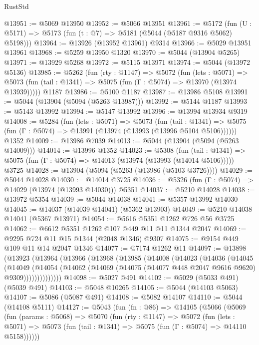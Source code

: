 \begin{lexlean}{RustStd}
\begin{coremodule}
@13951 := @5069 @13950
@13952 := @5066 @13951
@13961 := @5172 (fun (U : @5171) => @5173 (fun (t : @7) => @5181 (@5044 (@5187 @9316 @5062) @5198)))
@13964 := @13926 (@13952 @13961) @9314
@13966 := @5029 @13951 @13961
@13968 := @5259 @13950 @1320
@13970 := @5044 (@13904 @5265)
@13971 := @13929 @5268
@13972 := @5115 @13971
@13974 := @5044 (@13972 @5136)
@13985 := @5262
    (fun (rty : @1147) =>
    @5072
      (fun (lets : @5071) =>
      @5073 (fun (tail : @1341) => @5075 (fun (Γ : @5074) => @13970 (@13974 @13939)))))
    @1187
@13986 := @5100 @1187
@13987 := @13986 @5108
@13991 := @5044 (@13904 (@5094 (@5263 @13987)))
@13992 := @5144 @1187
@13993 := @5143 @13992
@13994 := @5147 @13992
@13996 := @13994 @13934 @9319
@14008 := @5284
    (fun (lets : @5071) =>
    @5073
      (fun (tail : @1341) =>
      @5075 (fun (Γ : @5074) => @13991 (@13974 (@13993 (@13996 @5104 @5106))))))
    @1352
@14009 := @13986 @7039
@14013 := @5044 (@13904 (@5094 (@5263 @14009)))
@14014 := @13996 @1352
@14023 := @5308
    (fun (tail : @1341) => @5075 (fun (Γ : @5074) => @14013 (@13974 (@13993 (@14014 @5106)))))
    @3725
@14028 := @13904 (@5094 (@5263 (@13986 (@5103 @3726))))
@14029 := @5044 @14028
@14030 := @14014 @3725
@14036 := @5326 (fun (Γ : @5074) => @14029 (@13974 (@13993 @14030))) @5351
@14037 := @5210 @14028
@14038 := @13972 @5354
@14039 := @5044 @14038
@14041 := @5357 @13992 @14030
@14045 := @14037 (@14039 @14041) (@5362 @13903)
@14049 := @5210 @14038 @14041 (@5367 @13971)
@14054 := @5616 @5351 @1262 @726 @56 @3725
@14062 := @6612 @5351 @1262 @107 @449 @11 @11 @1344 @2047
@14069 := @9295 @724 @11 @15 @1344 (@2048 @1346) @9307
@14075 := @9154 @449 @109 @11 @14 @2047 @1346
@14077 := @7174 @1262 @11
@14097 := @13898
    (@13923
      (@13964
        (@13966
          (@13968
            (@13985
              (@14008
                (@14023
                  (@14036
                    (@14045
                      (@14049
                        (@14054
                          (@14062
                            (@14069 (@14075 (@14077 @448 @2047 @9616 @9620) @9309))))))))))))))
@14098 := @5027 @491
@14102 := @5029 (@5033 @491) (@5039 @491)
@14103 := @5048 @10265
@14105 := @5044 (@14103 @5063)
@14107 := @5086 (@5087 @491)
@14108 := @5082 @14107
@14110 := @5044 (@14108 @5111)
@14127 := @5043
    (fun (fn : @86) =>
    @14105
      (@5066
        (@5069
          (fun (params : @5068) =>
          @5070
            (fun (rty : @1147) =>
            @5072
              (fun (lets : @5071) =>
              @5073 (fun (tail : @1341) => @5075 (fun (Γ : @5074) => @14110 @5158))))))

\end{coremodule}
\end{lexlean}
